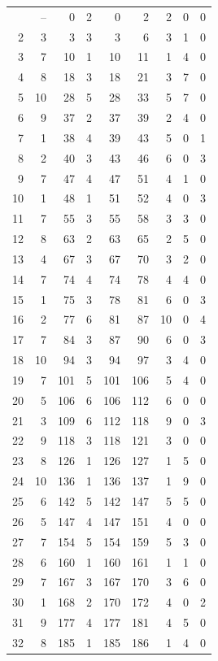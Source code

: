 \begin{longtable}{@{}rrrrrrrrr@{}}
\bottomrule \endlastfoot
1 & -- & 0 & 2 & 0 & 2 & 2 & 0 & 0 \\
2 & 3 & 3 & 3 & 3 & 6 & 3 & 1 & 0 \\
3 & 7 & 10 & 1 & 10 & 11 & 1 & 4 & 0 \\
4 & 8 & 18 & 3 & 18 & 21 & 3 & 7 & 0 \\
5 & 10 & 28 & 5 & 28 & 33 & 5 & 7 & 0 \\
6 & 9 & 37 & 2 & 37 & 39 & 2 & 4 & 0 \\
7 & 1 & 38 & 4 & 39 & 43 & 5 & 0 & 1 \\
8 & 2 & 40 & 3 & 43 & 46 & 6 & 0 & 3 \\
9 & 7 & 47 & 4 & 47 & 51 & 4 & 1 & 0 \\
10 & 1 & 48 & 1 & 51 & 52 & 4 & 0 & 3 \\
11 & 7 & 55 & 3 & 55 & 58 & 3 & 3 & 0 \\
12 & 8 & 63 & 2 & 63 & 65 & 2 & 5 & 0 \\
13 & 4 & 67 & 3 & 67 & 70 & 3 & 2 & 0 \\
14 & 7 & 74 & 4 & 74 & 78 & 4 & 4 & 0 \\
15 & 1 & 75 & 3 & 78 & 81 & 6 & 0 & 3 \\
16 & 2 & 77 & 6 & 81 & 87 & 10 & 0 & 4 \\
17 & 7 & 84 & 3 & 87 & 90 & 6 & 0 & 3 \\
18 & 10 & 94 & 3 & 94 & 97 & 3 & 4 & 0 \\
19 & 7 & 101 & 5 & 101 & 106 & 5 & 4 & 0 \\
20 & 5 & 106 & 6 & 106 & 112 & 6 & 0 & 0 \\
21 & 3 & 109 & 6 & 112 & 118 & 9 & 0 & 3 \\
22 & 9 & 118 & 3 & 118 & 121 & 3 & 0 & 0 \\
23 & 8 & 126 & 1 & 126 & 127 & 1 & 5 & 0 \\
24 & 10 & 136 & 1 & 136 & 137 & 1 & 9 & 0 \\
25 & 6 & 142 & 5 & 142 & 147 & 5 & 5 & 0 \\
26 & 5 & 147 & 4 & 147 & 151 & 4 & 0 & 0 \\
27 & 7 & 154 & 5 & 154 & 159 & 5 & 3 & 0 \\
28 & 6 & 160 & 1 & 160 & 161 & 1 & 1 & 0 \\
29 & 7 & 167 & 3 & 167 & 170 & 3 & 6 & 0 \\
30 & 1 & 168 & 2 & 170 & 172 & 4 & 0 & 2 \\
31 & 9 & 177 & 4 & 177 & 181 & 4 & 5 & 0 \\
32 & 8 & 185 & 1 & 185 & 186 & 1 & 4 & 0 \\

\end{longtable}
